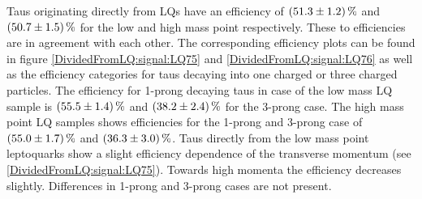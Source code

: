 %
Taus originating directly from LQs have an efficiency of $\SI{51.3\pm 1.2}{\percent}$ and $\SI{50.7\pm 1.5}{\percent}$ for the low and high mass point respectively. These to efficiencies are in agreement with each other. The corresponding efficiency plots can be found in figure \ref{DividedFromLQ:signal:LQ75} and \ref{DividedFromLQ:signal:LQ76} as well as the efficiency categories for taus decaying into one charged or three charged particles. The efficiency for 1-prong decaying taus in case of the low mass LQ sample is $\SI{55.5\pm 1.4}{\percent}$ and $\SI{38.2\pm 2.4}{\percent}$ for the 3-prong case. The high mass point LQ samples shows efficiencies for the 1-prong and 3-prong case of $\SI{55.0\pm 1.7}{\percent}$ and $\SI{36.3\pm 3.0}{\percent}$. Taus directly from the low mass point leptoquarks show a slight efficiency dependence of the transverse momentum (see \ref{DividedFromLQ:signal:LQ75}). Towards high momenta the efficiency decreases slightly. Differences in 1-prong and 3-prong cases are not present.\par
